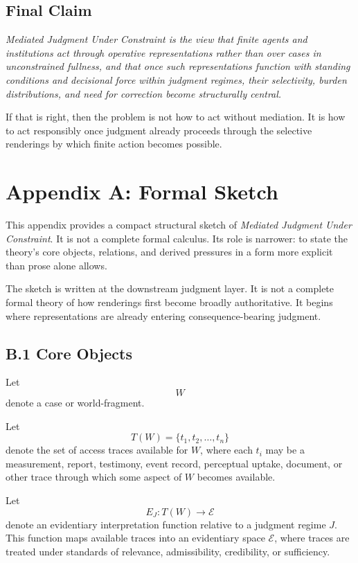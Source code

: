\documentclass[11pt]{article}
\renewenvironment{quote}
  {\list{}{\leftmargin=1.4em \rightmargin=1.0em}%
   \item\relax\color{softink}\itshape}
  {\endlist}
\renewcommand{\emph}[1]{\textit{#1}}
\begin{document}
\subsection{Final Claim}

\begin{quote}
\emph{Mediated Judgment Under Constraint} is the view that finite agents and institutions act through operative representations rather than over cases in unconstrained fullness, and that once such representations function with standing conditions and decisional force within judgment regimes, their selectivity, burden distributions, and need for correction become structurally central.
\end{quote}

If that is right, then the problem is not how to act without mediation. It is how to act responsibly once judgment already proceeds through the selective renderings by which finite action becomes possible.

\appendix
\section*{Appendix A: Formal Sketch}

This appendix provides a compact structural sketch of \emph{Mediated Judgment Under Constraint}. It is not a complete formal calculus. Its role is narrower: to state the theory's core objects, relations, and derived pressures in a form more explicit than prose alone allows.

The sketch is written at the downstream judgment layer. It is not a complete formal theory of how renderings first become broadly authoritative. It begins where representations are already entering consequence-bearing judgment.

\subsection*{B.1 Core Objects}

Let
\[
W
\]
denote a case or world-fragment.

Let
\[
T(W)=\{t_1,t_2,\dots,t_n\}
\]
denote the set of access traces available for \(W\), where each \(t_i\) may be a measurement, report, testimony, event record, perceptual uptake, document, or other trace through which some aspect of \(W\) becomes available.

Let
\[
E_J : T(W)\to \mathcal{E}
\]
denote an evidentiary interpretation function relative to a judgment regime \(J\). This function maps available traces into an evidentiary space \(\mathcal{E}\), where traces are treated under standards of relevance, admissibility, credibility, or sufficiency.
\end{document}
